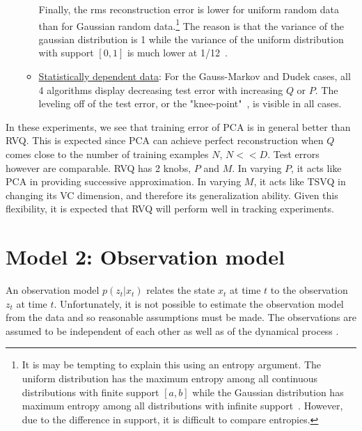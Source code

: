 \begin{Body}
\begin{enumerate}
\begin{itemize}
Finally, the rms reconstruction error is lower for uniform random data than for Gaussian random data.\footnote{It is may be tempting to explain this using an entropy argument.  The uniform distribution has the maximum entropy among all continuous distributions with finite support $[a,b]$ while the Gaussian distribution has maximum entropy among all distributions with infinite support~\cite{1982_JNL_MaxEntropy_Jaynes}.  However, due to the difference in support, it is difficult to compare entropies.} The reason is that the variance of the gaussian distribution is 1 while the variance of the uniform distribution with support $[0,1]$ is much lower at 1/12~\cite{1993_BOOK_RandomProcesses_Garcia}.
\item \underline{Statistically dependent data}: For the Gauss-Markov and Dudek cases, all 4 algorithms display decreasing test error with increasing $Q$ or $P$. The leveling off of the test error, or the "knee-point"~\cite{2009_BOOK_PRML_Escolano}, is visible in all cases.
\end{itemize}
\end{enumerate}
In these experiments, we see that training error of PCA is in general better than RVQ. This is expected since PCA can achieve perfect reconstruction when $Q$ comes close to the number of training examples $N$, $N<<D$.  Test errors however are comparable.  RVQ has 2 knobs, $P$ and $M$. In varying $P$, it acts like PCA in providing successive approximation. In varying $M$, it acts like TSVQ in changing its VC dimension, and therefore its generalization ability.  Given this flexibility, it is expected that RVQ will perform well in tracking experiments.

\section{Model 2: Observation model}
An observation model $p(z_t|x_t)$ relates the state $x_t$ at time $t$ to the observation $z_t$ at time $t$.  Unfortunately, it is not possible to estimate the observation model from the data and so reasonable assumptions must be made.  The observations are assumed to be independent of each other as well as of the dynamical process \cite{1998_JNL_Condensation_IsardBlake}. 



\end{Body}
